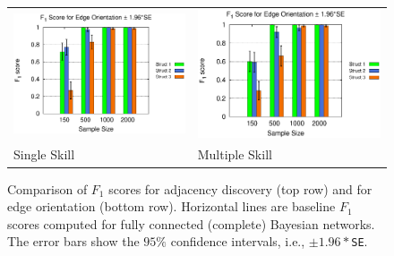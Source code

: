 \documentclass{edm_template}
\begin{document}
\begin{figure}[!ht]
\begin{center}
\begin{tabular}{>{\centering}m{1.5in} >{\centering\arraybackslash}m{1.5in}}
				\includegraphics[width=1.1\linewidth]{figures/F1O_single.eps} &\includegraphics[width=1.1\linewidth]{figures/F1O_multi.eps}\\
				Single Skill& Multiple Skill
			\end{tabular}
		\end{center}
		\vspace{-0.5em}
		\caption{Comparison of $F_1$ scores for adjacency discovery (top row) and for edge orientation (bottom row). 
			Horizontal lines are baseline $F_1$ scores computed for fully connected (complete) Bayesian networks.
			The error bars show the $95\%$ confidence intervals, i.e., $\pm 1.96*$\texttt{SE}.} 
		\label{fig:f1-single-multi}
	\end{figure} 
\end{document}
